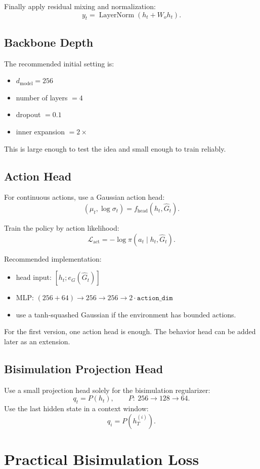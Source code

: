 \documentclass[11pt]{article}
\begin{document}
Finally apply residual mixing and normalization:
\[
y_t = \operatorname{LayerNorm}(h_t + W_o h_t).
\]

\subsection{Backbone Depth}
The recommended initial setting is:
\begin{itemize}[leftmargin=1.5em]
    \item $d_{\text{model}} = 256$
    \item number of layers $= 4$
    \item dropout $= 0.1$
    \item inner expansion $= 2\times$
\end{itemize}

This is large enough to test the idea and small enough to train reliably.

\subsection{Action Head}
For continuous actions, use a Gaussian action head:
\[
(\mu_t, \log \sigma_t) = f_{\text{head}}(h_t, \widehat{G}_t).
\]

Train the policy by action likelihood:
\[
\mathcal{L}_{\text{act}} = -\log \pi(a_t \mid h_t, \widehat{G}_t).
\]

Recommended implementation:
\begin{itemize}[leftmargin=1.5em]
    \item head input: $[h_t; e_G(\widehat{G}_t)]$
    \item MLP: $(256+64) \rightarrow 256 \rightarrow 256 \rightarrow 2\cdot \texttt{action\_dim}$
    \item use a tanh-squashed Gaussian if the environment has bounded actions.
\end{itemize}

For the first version, one action head is enough. The behavior head can be added later as an extension.

\subsection{Bisimulation Projection Head}
Use a small projection head solely for the bisimulation regularizer:
\[
q_t = P(h_t), \qquad P:\ 256 \rightarrow 128 \rightarrow 64.
\]
Use the last hidden state in a context window:
\[
q_i = P(h_T^{(i)}).
\]

\section{Practical Bisimulation Loss}
\end{document}
